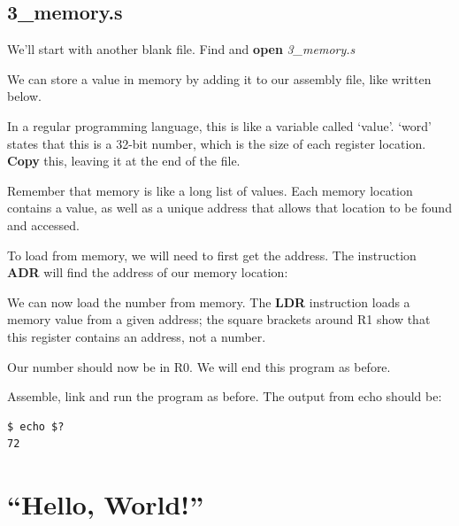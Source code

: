 \documentclass[a4paper, twocolumn, twoside, 11pt]{article}
\begin{document}
		\subsection*{3\_memory.s}
		
		We'll start with another blank file. Find and \textbf{open} \textit{3\_memory.s}
		 
		
		
		We can store a value in memory by adding it to our assembly file, like written below.
		
		In a regular programming language, this is like a variable called `value'. `word' states that this is a 32-bit number, which is the size of each register location. \textbf{Copy} this, leaving it at the end of the file.
		
		
		
		Remember that memory is like a long list of values. Each memory location contains a value, as well as a unique address that allows that location to be found and accessed.
		
		To load from memory, we will need to first get the address. The instruction \textbf{ADR} will find the address of our memory location:
		
		
		
		We can now load the number from memory. The \textbf{LDR} instruction loads a memory value from a given address; the square brackets around R1 show that this register contains an address, not a number.
		
		
		
		Our number should now be in R0. We will end this program as before.
		
		
		
		Assemble, link and run the program as before. The output from echo should be:
		
		\begin{lstlisting}
$ echo $?
72
		\end{lstlisting}

	\section{``Hello, World!''}
	
\end{document}
